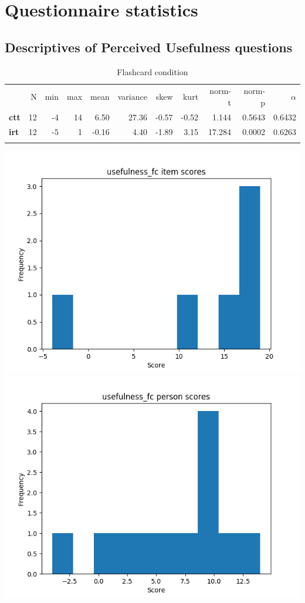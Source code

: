 \chapter{Questionnaire statistics}

\section{Descriptives of Perceived Usefulness questions}

\begin{longtable}[c]{@{}lrrrrrrrrrr@{}}
\caption{Flashcard condition}
\endfirsthead
\endhead
\toprule\addlinespace
& N & min & max & mean & variance & skew & kurt & norm-t &
norm-p & $\alpha$
\\\addlinespace
\midrule
\textbf{ctt} & 12 & -4 & 14 & 6.50 & 27.36 & -0.57 & -0.52 & 1.144 &
0.5643 & 0.6432
\\\addlinespace
\textbf{irt} & 12 & -5 & 1 & -0.16 & 4.40 & -1.89 & 3.15 & 17.284 &
0.0002 & 0.6263
\\\addlinespace
\bottomrule
\end{longtable}

\includegraphics[width=\textwidth]{img/usefulness_fc_diff.png}
\includegraphics[width=\textwidth]{img/usefulness_fc_abil.png}

